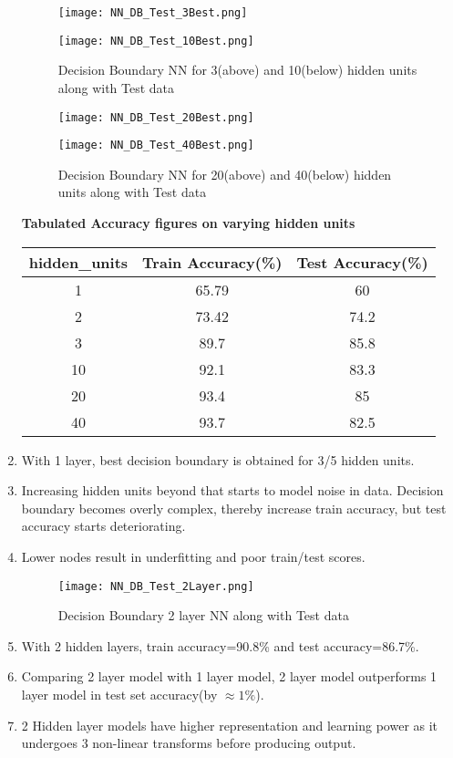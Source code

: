 \documentclass{article}
\newcommand{\bld}[1]{\textbf{#1}}
\begin{document}
\begin{enumerate}
\begin{figure}[h]
\vspace*{-2cm}
\hspace*{-1.5cm}
\centering
\texttt{[image: NN\_DB\_Test\_3Best.png]}
\vspace*{-1.5cm}
\caption{Decision Boundary NN for 3(above) and 10(below) hidden units along with Test data}
\hspace*{-1.5cm}
\centering
\texttt{[image: NN\_DB\_Test\_10Best.png]}
\end{figure}

\begin{figure}[h]
\vspace*{-2cm}
\hspace*{-1.5cm}
\centering
\texttt{[image: NN\_DB\_Test\_20Best.png]}
\vspace*{-1.5cm}
\caption{Decision Boundary NN for 20(above) and 40(below) hidden units along with Test data}
\hspace*{-1.5cm}
\centering
\texttt{[image: NN\_DB\_Test\_40Best.png]}
\end{figure}

\clearpage
\bld{Tabulated Accuracy figures on varying hidden units}
\begin{center}
 \begin{tabular}{||c|c|c||} 
 \hline
 hidden\_units & Train Accuracy(\%) & Test Accuracy(\%) \\ [0.5ex] 
 \hline\hline
 1 & 65.79 & 60\\
 \hline
 2 & 73.42 & 74.2\\ 
 \hline
 3 & 89.7 & 85.8\\ 
 \hline
 10 & 92.1 & 83.3\\ 
 \hline
 20 & 93.4 & 85\\ 
 \hline
 40 & 93.7 & 82.5\\ 
 \hline
\end{tabular}
\end{center}
	\item With 1 layer, best decision boundary is obtained for 3/5 hidden units.
	\item Increasing hidden units beyond that starts to model noise in data. Decision boundary becomes overly complex, thereby increase train accuracy, but test accuracy starts deteriorating.
	\item Lower nodes result in underfitting and poor train/test scores.
\begin{figure}[h]
\hspace*{-1.5cm}
\centering
\texttt{[image: NN\_DB\_Test\_2Layer.png]}
\vspace*{-1.5cm}
\caption{Decision Boundary 2 layer NN along with Test data}
\end{figure}
	\item With 2 hidden layers, train accuracy=90.8\% and test accuracy=86.7\%.
	\item Comparing 2 layer model with 1 layer model, 2 layer model outperforms 1 layer model in test set accuracy(by $\approx 1\%$).
	\item 2 Hidden layer models have higher representation and learning power as it undergoes 3 non-linear transforms before producing output.
\end{enumerate}
\end{document}
